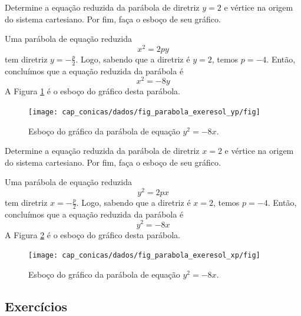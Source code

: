 \begin{exeresol}
  Determine a equação reduzida da parábola de diretriz $y=2$ e vértice na origem do sistema cartesiano. Por fim, faça o esboço de seu gráfico.
\end{exeresol}
\begin{resol}
  Uma parábola de equação reduzida
  \begin{equation}
    x^2 = 2py
  \end{equation}
  tem diretriz $\displaystyle y=-\frac{p}{2}$. Logo, sabendo que a diretriz é $y=2$, temos $p = -4$. Então, concluímos que a equação reduzida da parábola é
  \begin{equation}
    x^2 = -8y
  \end{equation}
  A Figura \ref{fig:parabola_exeresol_yp} é o esboço do gráfico desta parábola.

  \begin{figure}[H]
    \centering
    \texttt{[image: cap\_conicas/dados/fig\_parabola\_exeresol\_yp/fig]}
    \caption{Esboço do gráfico da parábola de equação $y^2 = -8x$.}
    \label{fig:parabola_exeresol_yp}
  \end{figure}  
\end{resol}

\begin{exeresol}
  Determine a equação reduzida da parábola de diretriz $x=2$ e vértice na origem do sistema cartesiano. Por fim, faça o esboço de seu gráfico.
\end{exeresol}
\begin{resol}
  Uma parábola de equação reduzida
  \begin{equation}
    y^2 = 2px
  \end{equation}
  tem diretriz $\displaystyle x=-\frac{p}{2}$. Logo, sabendo que a diretriz é $x=2$, temos $p = -4$. Então, concluímos que a equação reduzida da parábola é
  \begin{equation}
    y^2 = -8x
  \end{equation}
  A Figura \ref{fig:parabola_exeresol_xp} é o esboço do gráfico desta parábola.

  \begin{figure}[H]
    \centering
    \texttt{[image: cap\_conicas/dados/fig\_parabola\_exeresol\_xp/fig]}
    \caption{Esboço do gráfico da parábola de equação $y^2 = -8x$.}
    \label{fig:parabola_exeresol_xp}
  \end{figure}  
\end{resol}

\subsection*{Exercícios}

